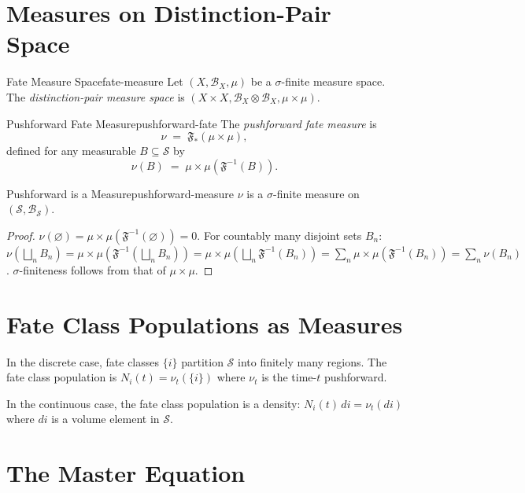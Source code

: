 \documentclass[12pt,twoside,openright]{book}
\newcommand{\fateMap}{\mathfrak{F}}
\newcommand{\fateSpace}{\mathcal{S}}
\providecommand{\pushFate}{\nu}
\providecommand{\stateMeasure}{\mu}
\providecommand{\pairMeasure}{\stateMeasure\times\stateMeasure}
\begin{document}
\section{Measures on Distinction-Pair Space}

\begin{definition}{Fate Measure Space}{fate-measure}
Let $(X,\mathcal{B}_X,\stateMeasure)$ be a $\sigma$-finite
measure space. The \emph{distinction-pair measure space}
is $(X\times X, \mathcal{B}_X\otimes\mathcal{B}_X,
\pairMeasure)$.
\end{definition}

\begin{definition}{Pushforward Fate Measure}{pushforward-fate}
The \emph{pushforward fate measure} is
\[
  \pushFate \;=\; \fateMap_*(\pairMeasure),
\]
defined for any measurable $B\subseteq\fateSpace$ by
\[
  \pushFate(B) \;=\; \pairMeasure(\fateMap^{-1}(B)).
\]
\end{definition}

\begin{theorem}{Pushforward is a Measure}{pushforward-measure}
$\pushFate$ is a $\sigma$-finite measure on $(\fateSpace,
\mathcal{B}_\fateSpace)$.
\begin{proof}
$\pushFate(\varnothing)=\pairMeasure(\fateMap^{-1}(\varnothing))=0$.
For countably many disjoint sets $B_n$:
$\pushFate(\bigsqcup_n B_n)=\pairMeasure(\fateMap^{-1}(
\bigsqcup_n B_n))=\pairMeasure(\bigsqcup_n\fateMap^{-1}(B_n))
=\sum_n\pairMeasure(\fateMap^{-1}(B_n))=\sum_n\pushFate(B_n)$.
$\sigma$-finiteness follows from that of $\pairMeasure$.
\end{proof}
\end{theorem}

\section{Fate Class Populations as Measures}

In the discrete case, fate classes $\{i\}$ partition
$\fateSpace$ into finitely many regions. The fate class
population is $N_i(t)=\pushFate_t(\{i\})$ where $\pushFate_t$
is the time-$t$ pushforward.

In the continuous case, the fate class population is a
density: $N_i(t)\,di = \pushFate_t(di)$ where $di$ is a
volume element in $\fateSpace$.

\section{The Master Equation}
\end{document}

